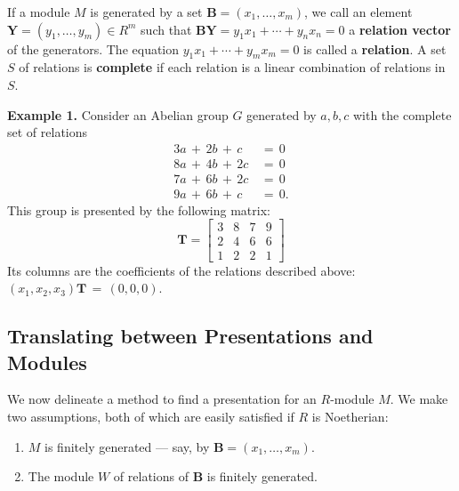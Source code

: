 \documentclass[11pt]{article}
\renewcommand{\vec}[1]{\mathbf{#1}}
\newcommand{\mat}[1]{\mathbf{#1}}
\begin{document}
If a module $M$ is generated by a set $\vec{B} = (x_{1}, \ldots, x_{m})$, we call an element $\vec{Y} = (y_{1}, \ldots, y_{m}) \in R^{m}$ such that $\vec{BY} = y_{1}x_{1} + \cdots + y_{n}x_{n} = 0$ a \textbf{relation vector} of the generators. The equation $y_{1}x_{1} + \cdots + y_{m}x_{m} = 0$ is called a \textbf{relation}. A set $S$ of relations is \textbf{complete} if each relation is a linear combination of relations in $S$.

\textbf{Example 1.} Consider an Abelian group $G$ generated by $a, b, c$ with the complete set of relations
\begin{align*}
  3a \, + \, 2b \, + \, c &= \, 0 \\
  8a \, + \, 4b \, + \, 2c \, &= \, 0 \\
  7a \, + \, 6b \, + \, 2c \, &= \, 0 \\
  9a \, + \, 6b \, + \, c \, &= \, 0.
\end{align*}
This group is presented by the following matrix:
\[
  \mat{T} = \begin{bmatrix} 3 & 8 & 7 & 9 \\ 2 & 4 & 6 & 6 \\ 1 & 2 & 2 & 1 \end{bmatrix}
\]
Its columns are the coefficients of the relations described above: $(x_{1}, x_{2}, x_{3}) \mat{T} \, = \, (0, 0, 0)$.

\subsection{Translating between Presentations and Modules}

We now delineate a method to find a presentation for an $R$-module $M$. We make two assumptions, both of which are easily satisfied if $R$ is Noetherian:
\begin{enumerate}
  \item $M$ is finitely generated --- say, by $\vec{B} = (x_{1}, \ldots, x_{m})$.
  \item The module $W$ of relations of $\vec{B}$ is finitely generated.
\end{enumerate}
\newpage
\end{document}

